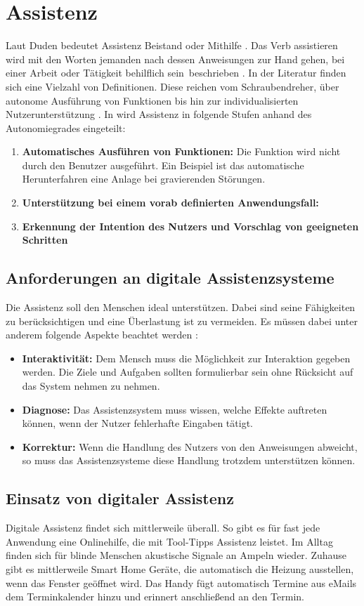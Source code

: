 \section{Assistenz}
Laut Duden bedeutet Assistenz Beistand oder Mithilfe \cite{DudenAssistenz}. Das Verb assistieren wird mit den Worten \glqq jemanden nach dessen Anweisungen zur Hand gehen, bei einer Arbeit oder Tätigkeit behilflich sein\grqq \ beschrieben \cite{DudenAssistieren}. In der Literatur finden sich eine Vielzahl von Definitionen. Diese reichen vom Schraubendreher, über autonome Ausführung von Funktionen bis hin zur individualisierten Nutzerunterstützung \cite{Ludwig}. In \cite{Wandke2005} wird Assistenz in folgende Stufen anhand des Autonomiegrades eingeteilt:
\begin{enumerate}
\item \textbf{Automatisches Ausführen von Funktionen:} Die Funktion wird nicht durch den Benutzer ausgeführt. Ein Beispiel ist das automatische Herunterfahren eine Anlage bei gravierenden Störungen.
\item \textbf{Unterstützung bei einem vorab definierten Anwendungsfall:}
\item \textbf{Erkennung der Intention des Nutzers und Vorschlag von geeigneten Schritten}
\end{enumerate}

\subsection{Anforderungen an digitale Assistenzsysteme}
Die Assistenz soll den Menschen ideal unterstützen. Dabei sind seine Fähigkeiten zu berücksichtigen und eine Überlastung ist zu vermeiden. Es müssen dabei unter anderem folgende Aspekte beachtet werden \cite{Ludwig}:
\begin{itemize}
\item \textbf{Interaktivität:} Dem Mensch muss die Möglichkeit zur Interaktion gegeben werden. Die Ziele und Aufgaben sollten formulierbar sein ohne Rücksicht auf das System nehmen zu nehmen.
\item \textbf{Diagnose:} Das Assistenzsystem muss wissen, welche Effekte auftreten können, wenn der Nutzer fehlerhafte Eingaben tätigt.
\item \textbf{Korrektur:} Wenn die Handlung des Nutzers von den Anweisungen abweicht, so muss das Assistenzsysteme diese Handlung trotzdem unterstützen können.
\end{itemize}

\subsection{Einsatz von digitaler Assistenz}
Digitale Assistenz findet sich mittlerweile überall. So gibt es für fast jede Anwendung eine Onlinehilfe, die mit Tool-Tipps Assistenz leistet. Im Alltag finden sich für blinde Menschen akustische Signale an Ampeln wieder. Zuhause gibt es mittlerweile Smart Home Geräte, die automatisch die Heizung ausstellen, wenn das Fenster geöffnet wird. Das Handy fügt automatisch Termine aus eMails dem Terminkalender hinzu und erinnert anschließend an den Termin.

